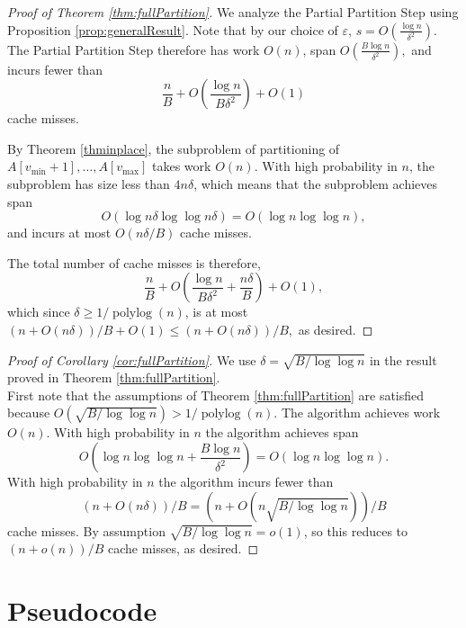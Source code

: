 \documentclass[a4paper,UKenglish,cleveref, autoref, thm-restate]{lipics-v2019}
\renewcommand{\epsilon}{\varepsilon}
\DeclareMathOperator{\polylog}{\text{polylog}}
\begin{document}
\begin{proof}[Proof of Theorem \ref{thm:fullPartition}]
  We analyze the Partial Partition Step using Proposition
  \ref{prop:generalResult}. Note that by our choice of $\epsilon$,
  $s=O\left(\frac{\log n}{\delta^2}\right)$.  The Partial Partition
  Step therefore has work $O(n)$, span $O\left(\frac{B\log
  n}{\delta^2}\right),$ and incurs fewer than
  $$\frac{n}{B}+O\left(\frac{\log n}{B\delta^2}\right)+O(1)$$ 
  cache misses.

  By Theorem \ref{thminplace}, the subproblem of partitioning of
  $A[v_{\text{min}} + 1], \ldots, A[v_{\text{max}}]$ takes work
  $O(n)$. With high probability in $n$, the subproblem has size
  less than $4n\delta$, which means that the subproblem achieves
  span $$O(\log n\delta \log\log n\delta) = O(\log n \log\log
  n),$$ and incurs at most $O(n \delta / B)$ cache misses.

  The total number of cache misses is therefore,
  $$\frac{n}{B}+O\left(\frac{\log n}{B\delta^2} +
  \frac{n\delta}{B}\right)+O(1),$$ which since $\delta \ge 1 /
  \polylog(n)$, is at most $(n+O(n\delta))/B + O(1) \le (n + O(n
  \delta)) / B,$ as desired.
\end{proof}

\begin{proof}[Proof of Corollary \ref{cor:fullPartition}] We use
  $\delta = \sqrt{B/\log\log n}$ in the result proved in Theorem
  \ref{thm:fullPartition}. \\
  First note that the assumptions of Theorem
  \ref{thm:fullPartition} are satisfied because
  $O(\sqrt{B/\log\log n}) > 1 / \polylog(n).$
  The algorithm achieves work $O(n)$. 
  With high probability in $n$ the algorithm achieves span 
  $$O\left(\log n \log\log n +\frac{B\log n}{\delta^2}\right) = O(\log n\log\log n).$$
  With high probability in $n$ the algorithm incurs fewer than 
  $$(n+O(n\delta))/B = (n+O(n\sqrt{B/\log\log n}))/B$$ 
  cache misses.
  By assumption $\sqrt{B/\log\log n} = o(1)$, so this reduces to 
  $(n+o(n))/B$
  cache misses, as desired.
\end{proof}


\section{Pseudocode}\label{sec:pseudocode}
\end{document}
